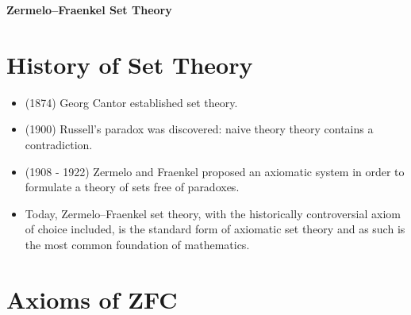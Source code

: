 \documentclass[11pt]{article}
\theoremstyle{definition}
\begin{document}




\begin{center}
{\LARGE \bf Zermelo–Fraenkel Set Theory}
\end{center}

\smallskip

\section{History of Set Theory}
\begin{itemize}
\item (1874) Georg Cantor established set theory.
\item (1900) Russell's paradox was discovered: naive theory theory contains a contradiction.
\item (1908 - 1922) Zermelo and Fraenkel proposed an axiomatic system in order to formulate a theory of sets free of paradoxes.
\item Today, Zermelo–Fraenkel set theory, with the historically controversial axiom of choice included, is the standard form of axiomatic set theory and as such is the most common foundation of mathematics.
\end{itemize}

\section{Axioms of ZFC}
\end{document}
